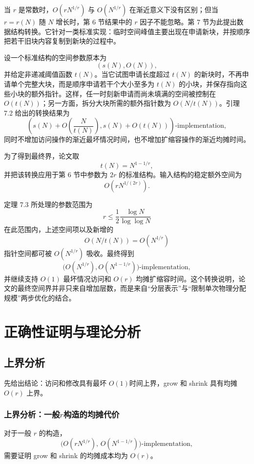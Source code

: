 \documentclass[12pt,a4paper]{article}
\begin{document}
当 $r$ 是常数时，$O(rN^{1/r})$ 与 $O(N^{1/r})$ 在渐近意义下没有区别；但当 $r=r(N)$ 随 $N$ 增长时，第 6 节结果中的 $r$ 因子不能忽略。第 7 节为此提出数据结构转换。它针对一类标准实现：临时空间峰值主要出现在申请新块，并按顺序把若干旧块内容复制到新块的过程中。

设一个标准结构的空间参数原本为
\[
    (s(N),O(N)),
\]
并给定非递减阈值函数 $t(N)$。当它试图申请长度超过 $t(N)$ 的新块时，不再申请单个完整大块，而是顺序申请若干个大小至多为 $t(N)$ 的小块，并保存指向这些小块的额外指针。这样，任一时刻新申请而尚未填满的空间被控制在 $O(t(N))$；另一方面，拆分大块所需的额外指针数为 $O(N/t(N))$。引理 7.2 给出的转换结果为\cite{tarjan2023optimalresizablearrays}
\[
    \left(
        s(N)+O\!\left(\frac{N}{t(N)}\right),
        s(N)+O(t(N))
    \right)\text{-implementation},
\]
同时不增加访问操作的渐近最坏情况时间，也不增加扩缩容操作的渐近均摊时间。

为了得到最终界，论文取
\[
    t(N)=N^{1-1/r},
\]
并把该转换应用于第 6 节中参数为 $2r$ 的标准结构。输入结构的稳定额外空间为
\[
    O(rN^{1/(2r)}).
\]
\begin{samepage}
定理 7.3\cite{tarjan2023optimalresizablearrays} 所处理的参数范围为
\[
    r\leq \frac{1}{2}\frac{\log N}{\log\log N}
\]
在此范围内，上述空间项以及新增的
\[
    O(N/t(N))=O(N^{1/r})
\]
指针空间都可被 $O(N^{1/r})$ 吸收。最终得到
\[
    \bigl(O(N^{1/r}),O(N^{1-1/r})\bigr)\text{-implementation},
\]
并继续支持 $O(1)$ 最坏情况访问和 $O(r)$ 均摊扩缩容时间。这个转换说明，论文的最终空间界并非只来自增加层数，而是来自“分层表示”与“限制单次物理分配规模”两步优化的结合。
\end{samepage}


\section{正确性证明与理论分析}

\subsection{上界分析}

先给出结论：访问和修改具有最坏 $O(1) $时间上界，grow 和 shrink 具有均摊 $O(r)$ 上界。

\subsubsection{上界分析：一般$r$构造的均摊代价}

对于一般 $r$ 的构造，
\[
\bigl(O(rN^{1/r}),\,O(N^{1-1/r})\bigr)\text{-implementation},
\]
需要证明 grow 和 shrink 的均摊成本均为 $O(r)$。
\end{document}
